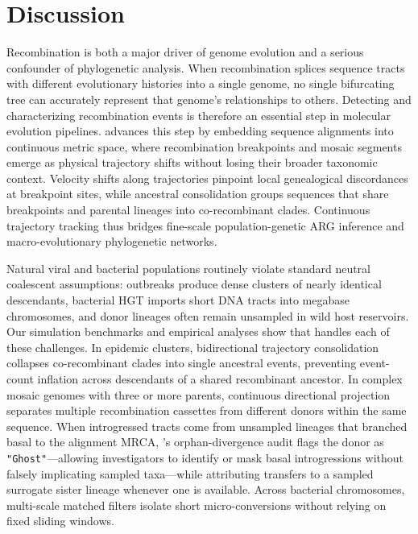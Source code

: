 \section{Discussion}
\label{sec:discussion}

Recombination is both a major driver of genome evolution and a serious confounder of phylogenetic analysis. When recombination splices sequence tracts with different evolutionary histories into a single genome, no single bifurcating tree can accurately represent that genome's relationships to others. Detecting and characterizing recombination events is therefore an essential step in molecular evolution pipelines. \RhizAeon advances this step by embedding sequence alignments into continuous metric space, where recombination breakpoints and mosaic segments emerge as physical trajectory shifts without losing their broader taxonomic context. Velocity shifts along \RhizAeon trajectories pinpoint local genealogical discordances at breakpoint sites, while ancestral consolidation groups sequences that share breakpoints and parental lineages into co-recombinant clades. Continuous trajectory tracking thus bridges fine-scale population-genetic ARG inference and macro-evolutionary phylogenetic networks.

Natural viral and bacterial populations routinely violate standard neutral coalescent assumptions: outbreaks produce dense clusters of nearly identical descendants, bacterial HGT imports short DNA tracts into megabase chromosomes, and donor lineages often remain unsampled in wild host reservoirs. Our simulation benchmarks and empirical analyses show that \RhizAeon handles each of these challenges. In epidemic clusters, bidirectional trajectory consolidation collapses co-recombinant clades into single ancestral events, preventing event-count inflation across descendants of a shared recombinant ancestor. In complex mosaic genomes with three or more parents, continuous directional projection separates multiple recombination cassettes from different donors within the same sequence. When introgressed tracts come from unsampled lineages that branched basal to the alignment MRCA, \RhizAeon's orphan-divergence audit flags the donor as \texttt{"Ghost"}—allowing investigators to identify or mask basal introgressions without falsely implicating sampled taxa—while attributing transfers to a sampled surrogate sister lineage whenever one is available. Across bacterial chromosomes, multi-scale matched filters isolate short micro-conversions without relying on fixed sliding windows.

